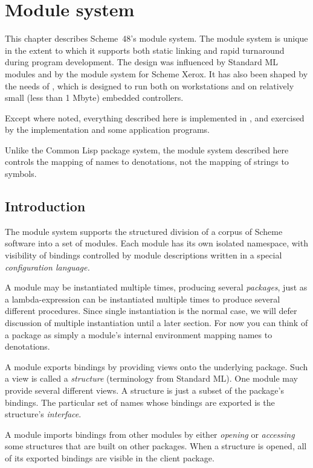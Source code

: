 \chapter{Module system}
\label{chapter:modules}

This chapter describes Scheme~48's module system.
The module system is unique in the extent to which it
supports both static linking and rapid turnaround during program
development.  The design was influenced by Standard ML
modules\cite{MacQueen:Modules} and by the module system for Scheme
Xerox\cite{Curtis-Rauen:Modules}.  It has also been shaped by the
needs of \hack{}, which is designed to run both on workstations and
on relatively small (less than 1 Mbyte) embedded controllers.

Except where noted, everything described here is implemented in
\hack{}, and exercised by the \hack{} implementation and some
application programs.

Unlike the Common Lisp package system, the module system described
here controls the mapping of names to denotations, not the
mapping of strings to symbols.

\section{Introduction}

The module system supports the structured division of a corpus of
Scheme software into a set of modules.  Each module has its own
isolated namespace, with visibility of bindings controlled by module
descriptions written in a special {\em configuration language.}

A module may be instantiated multiple times, producing several {\em
packages}, just as a lambda-expression can be instantiated multiple
times to produce several different procedures.  Since single
instantiation is the normal case, we will defer discussion of multiple
instantiation until a later section.  For now you can think of a
package as simply a module's internal environment mapping names to
denotations.

A module exports bindings by providing views onto the underlying
package.  Such a view is called a {\em structure} (terminology from
Standard ML).  One module may provide several different views.  A
structure is just a subset of the package's bindings.  The particular
set of names whose bindings are exported is the structure's {\em
interface}.

A module imports bindings from other modules by either {\em opening}
or {\em accessing} some structures that are built on other packages.
When a structure is opened, all of its exported bindings are visible
in the client package.

